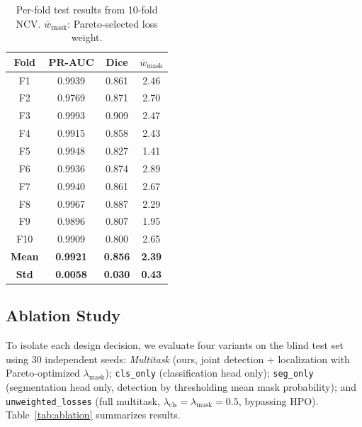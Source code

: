 \begin{table}[!t]
  \centering
  \caption{Per-fold test results from 10-fold NCV.
           $\overline{w}_{\text{mask}}$: Pareto-selected loss weight.}
  \label{tab:nested_cv}
  \begin{tabular}{cccc}
    \toprule
    Fold & PR-AUC & Dice & $\overline{w}_{\text{mask}}$ \\
    \midrule
    F1  & 0.9939 & 0.861 & 2.46 \\
    F2  & 0.9769 & 0.871 & 2.70 \\
    F3  & 0.9993 & 0.909 & 2.47 \\
    F4  & 0.9915 & 0.858 & 2.43 \\
    F5  & 0.9948 & 0.827 & 1.41 \\
    F6  & 0.9936 & 0.874 & 2.89 \\
    F7  & 0.9940 & 0.861 & 2.67 \\
    F8  & 0.9967 & 0.887 & 2.29 \\
    F9  & 0.9896 & 0.807 & 1.95 \\
    F10 & 0.9909 & 0.800 & 2.65 \\
    \midrule
    \textbf{Mean} & \textbf{0.9921} & \textbf{0.856} & \textbf{2.39} \\
    \textbf{Std}  & \textbf{0.0058} & \textbf{0.030} & \textbf{0.43} \\
    \bottomrule
  \end{tabular}
\end{table}

\subsection{Ablation Study}
\label{subsec:ablation}

To isolate each design decision, we evaluate four variants on the blind test
set using 30 independent seeds: \textit{Multitask} (ours, joint detection +
localization with Pareto-optimized $\lambda_{\text{mask}}$);
\texttt{cls\_only} (classification head only); \texttt{seg\_only}
(segmentation head only, detection by thresholding mean mask probability);
and \texttt{unweighted\_losses} (full multitask, $\lambda_{\text{cls}} =
\lambda_{\text{mask}} = 0.5$, bypassing HPO).
Table~\ref{tab:ablation} summarizes results.

